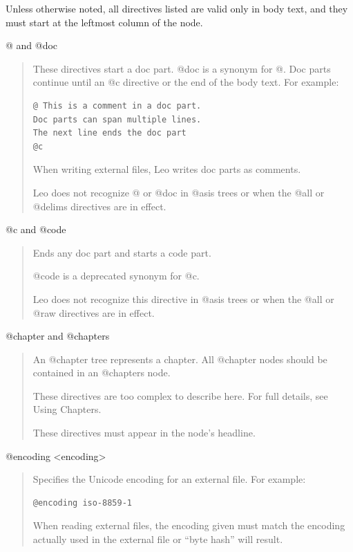 \documentclass[a4paper,10pt,english]{sphinxmanual}
\begin{document}
Unless otherwise noted, all directives listed are valid only in body text,
and they must start at the leftmost column of the node.
\begin{description}
\end{description}

@ and @doc
\begin{quote}

These directives start a doc part. @doc is a synonym for @. Doc parts
continue until an @c directive or the end of the body text. For example:

\begin{Verbatim}[commandchars=\\\{\}]
@ This is a comment in a doc part.
Doc parts can span multiple lines.
The next line ends the doc part
@c
\end{Verbatim}

When writing external files, Leo writes doc parts as comments.

Leo does not recognize @ or @doc in @asis trees or when the @all or
@delims directives are in effect.
\end{quote}

@c and @code
\begin{quote}

Ends any doc part and starts a code part.

@code is a deprecated synonym for @c.

Leo does not recognize this directive in @asis trees or when the
@all or @raw directives are in effect.
\end{quote}

@chapter and @chapters
\begin{quote}

An @chapter tree represents a chapter. All @chapter nodes should be
contained in an @chapters node.

These directives are too complex to describe here. For full details, see
Using Chapters.

These directives must appear in the node's headline.
\end{quote}

@encoding \textless{}encoding\textgreater{}
\begin{quote}

Specifies the Unicode encoding for an external file. For example:

\begin{Verbatim}[commandchars=\\\{\}]
@encoding iso-8859-1
\end{Verbatim}

When reading external files, the encoding given must match the encoding
actually used in the external file or ``byte hash'' will result.
\end{quote}
\end{document}
